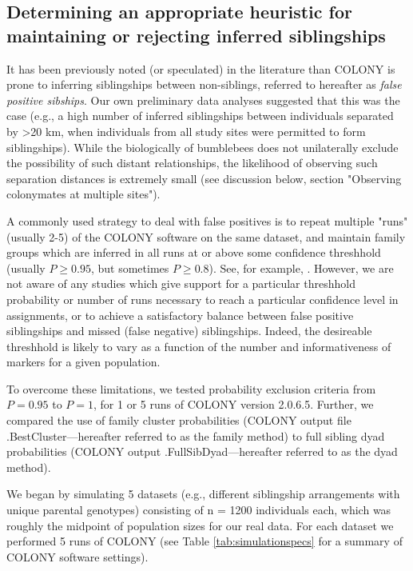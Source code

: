 \documentclass[12pt]{article}
\begin{document}
\subsection{Determining an appropriate heuristic for maintaining or rejecting inferred siblingships}

It has been previously noted (or speculated) in the literature than COLONY is prone to inferring siblingships between non-siblings, referred to hereafter as \emph{false positive sibships}. Our own preliminary data analyses suggested that this was the case (e.g., a high number of inferred siblingships between individuals separated by >20 km, when individuals from all study sites were permitted to form siblingships). While the biologically of bumblebees does not unilaterally exclude the possibility of such distant relationships, the likelihood of observing such separation distances is extremely small (see discussion below, section "Observing colonymates at multiple sites").

A commonly used strategy to deal with false positives is to repeat multiple "runs" (usually 2-5) of the COLONY software on the same dataset, and maintain family groups which are inferred in all runs at or above some confidence threshhold (usually $P \ge 0.95$, but sometimes $P \ge 0.8$). See, for example, \textcite{carvellMolecularSpatialAnalyses2012, raoBumbleBeeHymenoptera2012, dreierFinescaleSpatialGenetic2014a, geibBumbleBeeNest2015a, carvellBumblebeeFamilyLineage2017a, molaWildfireRevealsTransient2020a}. However, we are not aware of any studies which give support for a particular threshhold probability or number of runs necessary to reach a particular confidence level in assignments, or to achieve a satisfactory balance between false positive siblingships and missed (false negative) siblingships. Indeed, the desireable threshhold is likely to vary as a function of the number and informativeness of markers for a given population.

To overcome these limitations, we tested probability exclusion criteria from $P = 0.95$ to $P = 1$, for 1 or 5 runs of COLONY version 2.0.6.5. Further, we compared the use of family cluster probabilities (COLONY output file .BestCluster---hereafter referred to as the family method) to full sibling dyad probabilities (COLONY output .FullSibDyad---hereafter referred to as the dyad method).

We began by simulating 5 datasets (e.g., different siblingship arrangements with unique parental genotypes) consisting of n = 1200 individuals each, which was roughly the midpoint of population sizes for our real data. For each dataset we performed 5 runs of COLONY (see Table \ref{tab:simulationspecs} for a summary of COLONY software settings).
\end{document}
